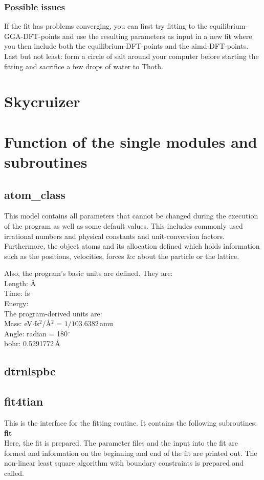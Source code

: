 \documentclass[twoside, 11pt, titlepage, captions=nooneline, a4paper, headsepline]{scrbook}%
\begin{document}
\subsection{Possible issues}
If the fit has problems converging, you can first try fitting to the equilibrium-GGA-DFT-points and use the resulting parameters as input in a new fit where you then include both the equilibrium-DFT-points and the aimd-DFT-points.
Last but not least: form a circle of salt around your computer before starting the fitting and sacrifice a few drops of water to Thoth.\\

\chapter{Skycruizer}

\chapter{Function of the single modules and subroutines}
\section{atom\_class}
This model contains all parameters that cannot be changed during the execution of the program as well as some default values. This includes commonly used irrational numbers and physical constants and unit-conversion factors. Furthermore, the object atoms and its allocation defined which holds information such as the positions, velocities, forces \&c about the particle or the lattice.

Also, the program's basic units   are defined. They are:\\
Length: \AA\\
Time: fs\\
Energy: \\
The program-derived units are:\\
Mass: eV$\cdot$fs$^2$/\AA$^2$ = $1/103.6382$\,amu\\
Angle: radian = 180$^\circ$\\
bohr: 0.5291772\,\AA
\section{dtrnlspbc}
\section{fit4tian}
This is the interface for the fitting routine. It contains the following subroutines:
\textbf{fit}\\
Here, the fit is prepared. The parameter files and the input into the fit are formed and information on the beginning and end of the fit are printed out. The non-linear least square algorithm with boundary constraints is prepared and called.
 
\end{document}
